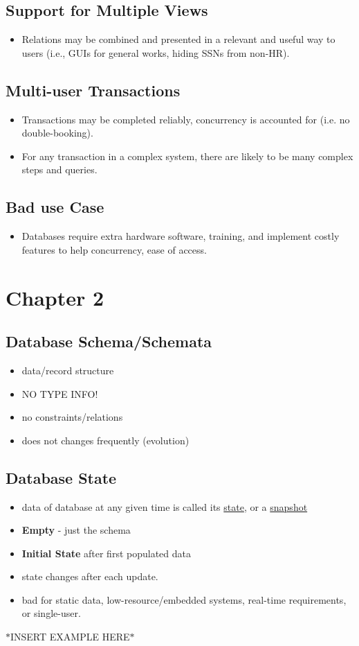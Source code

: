 \documentclass[12pt]{report}
\begin{document}
	\section{Support for Multiple Views}
	\begin{itemize}
		\item Relations may be combined and presented in a relevant and useful way to users (i.e., GUIs for general works, hiding SSNs from non-HR).
	\end{itemize}
	\section{Multi-user Transactions}
	\begin{itemize}
		\item Transactions may be completed reliably, concurrency is accounted for (i.e. no double-booking).
		\item For any transaction in a complex system, there are likely to be many complex steps and queries.
	\end{itemize}
	\section{Bad use Case}
	\begin{itemize}
		\item Databases require extra hardware software, training, and implement costly features to help concurrency, ease of access.
	\end{itemize}
	\chapter{Chapter 2}
	\section{Database Schema/Schemata}
	\begin{itemize}
		\item data/record structure
		\item NO TYPE INFO!
		\item no constraints/relations
		\item does not changes frequently (evolution)
	\end{itemize}
	\section{Database State}
	\begin{itemize}
		\item data of database at any given time is called its \underline{state}, or a \underline{snapshot}
		\item \textbf{Empty} - just the schema
		\item \textbf{Initial State} after first populated data
		\item state changes after each update.
		\item bad for static data, low-resource/embedded systems, real-time requirements, or single-user.
	\end{itemize}
	$\ast$INSERT EXAMPLE HERE$\ast$
	
\end{document}
